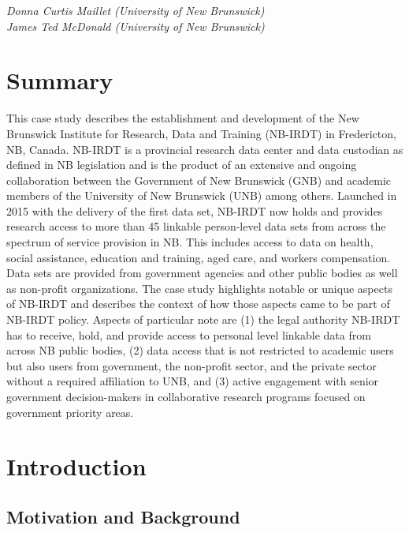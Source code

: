 \documentclass[
]{book}
\begin{document}
\emph{Donna Curtis Maillet (University of New Brunswick)}\\
\emph{James Ted McDonald (University of New Brunswick)}

\hypertarget{summary-3}{%
\section{Summary}\label{summary-3}}

This case study describes the establishment and development of the New Brunswick Institute for Research, Data and Training (NB-IRDT) in Fredericton, NB, Canada. NB-IRDT is a provincial research data center and data custodian as defined in NB legislation and is the product of an extensive and ongoing collaboration between the Government of New Brunswick (GNB) and academic members of the University of New Brunswick (UNB) among others. Launched in 2015 with the delivery of the first data set, NB-IRDT now holds and provides research access to more than 45 linkable person-level data sets from across the spectrum of service provision in NB. This includes access to data on health, social assistance, education and training, aged care, and workers compensation. Data sets are provided from government agencies and other public bodies as well as non-profit organizations. The case study highlights notable or unique aspects of NB-IRDT and describes the context of how those aspects came to be part of NB-IRDT policy. Aspects of particular note are (1) the legal authority NB-IRDT has to receive, hold, and provide access to personal level linkable data from across NB public bodies, (2) data access that is not restricted to academic users but also users from government, the non-profit sector, and the private sector without a required affiliation to UNB, and (3) active engagement with senior government decision-makers in collaborative research programs focused on government priority areas.

\hypertarget{introduction-3}{%
\section{Introduction}\label{introduction-3}}

\hypertarget{motivation-and-background-2}{%
\subsection{Motivation and Background}\label{motivation-and-background-2}}
\end{document}
